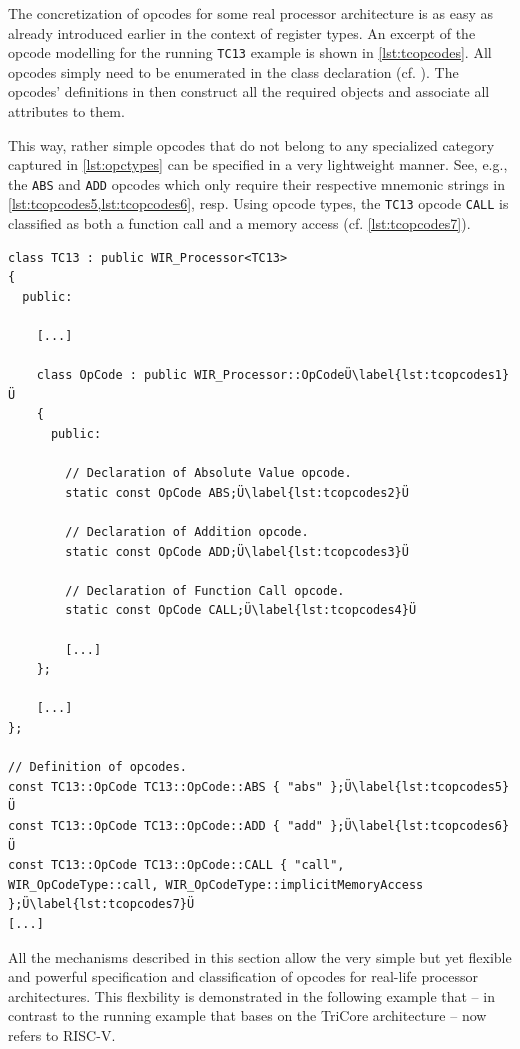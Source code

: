 The concretization of opcodes for some real processor architecture is as easy as already introduced earlier in the context of register types.
An excerpt of the opcode modelling for the running \texttt{TC13} example is shown in \cref{lst:tcopcodes}.
All opcodes simply need to be enumerated in the class declaration (cf. ).
The opcodes' definitions in  then construct all the required objects and associate all attributes to them.

This way, rather simple opcodes that do not belong to any specialized category captured in \cref{lst:opctypes} can be specified in a very lightweight manner.
See, e.g., the \texttt{ABS} and \texttt{ADD} opcodes which only require their respective mnemonic strings in \cref{lst:tcopcodes5,lst:tcopcodes6}, resp.
Using opcode types, the \texttt{TC13} opcode \texttt{CALL} is classified as both a function call and a memory access (cf. \cref{lst:tcopcodes7}).

\begin{lstlisting}[style=code,float=t,caption={Concrete Opcode Handling (here for Class \texttt{TC13})},label=lst:tcopcodes]
class TC13 : public WIR_Processor<TC13>
{
  public:

    [...]

    class OpCode : public WIR_Processor::OpCodeÜ\label{lst:tcopcodes1}Ü
    {
      public:

        // Declaration of Absolute Value opcode.
        static const OpCode ABS;Ü\label{lst:tcopcodes2}Ü

        // Declaration of Addition opcode.
        static const OpCode ADD;Ü\label{lst:tcopcodes3}Ü

        // Declaration of Function Call opcode.
        static const OpCode CALL;Ü\label{lst:tcopcodes4}Ü

        [...]
    };

    [...]
};

// Definition of opcodes.
const TC13::OpCode TC13::OpCode::ABS { "abs" };Ü\label{lst:tcopcodes5}Ü
const TC13::OpCode TC13::OpCode::ADD { "add" };Ü\label{lst:tcopcodes6}Ü
const TC13::OpCode TC13::OpCode::CALL { "call",                                                                                                   WIR_OpCodeType::call, WIR_OpCodeType::implicitMemoryAccess };Ü\label{lst:tcopcodes7}Ü
[...]
\end{lstlisting}

All the mechanisms described in this section allow the very simple but yet flexible and powerful specification and classification of opcodes for real-life processor architectures.
This flexbility is demonstrated in the following example that -- in contrast to the running example that bases on the TriCore architecture -- now refers to RISC-V.


